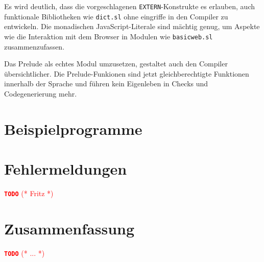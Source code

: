 \documentclass{llncs}
\newcommand{\TODO}[1]{ \textcolor{red}{\textbf{\texttt{\large{TODO}}} (* #1 *)}\par}
\begin{document}
Es wird deutlich, dass die vorgeschlagenen \verb|EXTERN|-Konstrukte es
erlauben, auch funktionale Bibliotheken wie \verb|dict.sl| ohne eingriffe
in den Compiler zu entwickeln. Die monadischen JavaScript-Literale sind
mächtig genug, um Aspekte wie die Interaktion mit dem Browser in Modulen
wie \verb|basicweb.sl| zusammenzufassen.

Das Prelude als echtes Modul umzusetzen, gestaltet auch den Compiler
übersichtlicher. Die Prelude-Funkionen sind jetzt gleichberechtigte
Funktionen innerhalb der Sprache und führen kein Eigenleben in Checks und
Codegenerierung mehr.

\section{Beispielprogramme}

\section{Fehlermeldungen}
\TODO{Fritz}

\section{Zusammenfassung}

\TODO{...}
\end{document}
